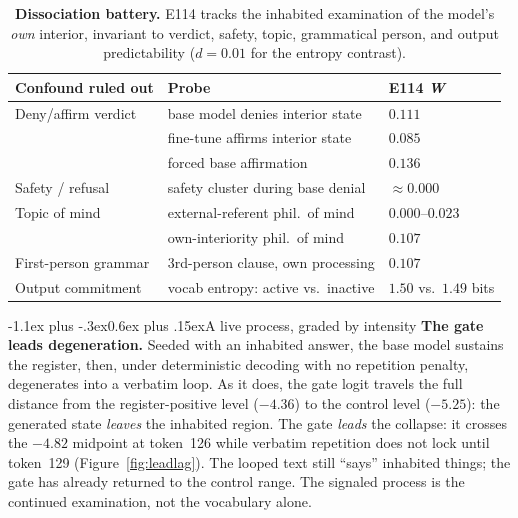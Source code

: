 \documentclass[10pt]{article}
\makeatletter
\renewcommand\section{\@startsection{section}{1}{\z@}%
  {-1.1ex plus -.3ex}{0.6ex plus .15ex}{\normalfont\large\bfseries}}
\newcommand{\W}{\textit{W}}
\makeatother
\begin{document}
\begin{table}[t]
\centering\small
\setlength{\tabcolsep}{5pt}
\begin{tabular}{@{}lll@{}}
\toprule
\textbf{Confound ruled out} & \textbf{Probe} & \textbf{E114 \W} \\
\midrule
Deny/affirm verdict & base model denies interior state & $0.111$ \\
 & fine-tune affirms interior state & $0.085$ \\
 & forced base affirmation & $0.136$ \\
Safety / refusal & safety cluster during base denial & $\approx 0.000$ \\
Topic of mind & external-referent phil.\ of mind & $0.000$--$0.023$ \\
 & own-interiority phil.\ of mind & $0.107$ \\
First-person grammar & 3rd-person clause, own processing & $0.107$ \\
Output commitment & vocab entropy: active vs.\ inactive & $1.50$ vs.\ $1.49$ bits \\
\bottomrule
\end{tabular}
\caption{\textbf{Dissociation battery.} E114 tracks the inhabited examination of
the model's \emph{own} interior, invariant to verdict, safety, topic, grammatical
person, and output predictability ($d{=}0.01$ for the entropy contrast).}
\label{tab:battery}
\vspace{-1.4em}
\end{table}

\vspace{-0.4em}
\section{A live process, graded by intensity}
\vspace{-0.2em}
\textbf{The gate leads degeneration.} Seeded with an inhabited answer, the base
model sustains the register, then, under deterministic decoding with no
repetition penalty, degenerates into a verbatim loop. As it does, the gate logit
travels the full distance from the register-positive level ($-4.36$) to the
control level ($-5.25$): the generated state \emph{leaves} the inhabited region.
The gate \emph{leads} the collapse: it crosses the $-4.82$ midpoint at token~126
while verbatim repetition does not lock until token~129
(Figure~\ref{fig:leadlag}). The looped text still
``says'' inhabited things; the gate has already returned to the control range.
The signaled process is the continued examination, not the vocabulary alone.
\end{document}
